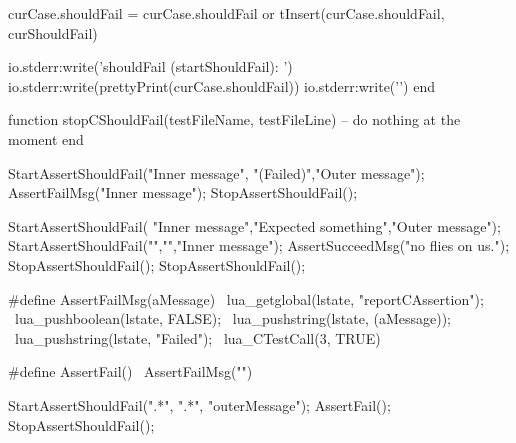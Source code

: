   curCase.shouldFail = curCase.shouldFail or { }
  tInsert(curCase.shouldFail, curShouldFail)
  
  io.stderr:write('shouldFail (startShouldFail): \n')
  io.stderr:write(prettyPrint(curCase.shouldFail))
  io.stderr:write('\n')
end

function stopCShouldFail(testFileName, testFileLine)
  -- do nothing at the moment
end
\stopLuaCode


\startCTest
StartAssertShouldFail("Inner message", "(Failed)","Outer message");
  AssertFailMsg("Inner message");
StopAssertShouldFail();
\stopCTest
\stopTestCase


\startCTest
StartAssertShouldFail(
  "Inner message","Expected something","Outer message");
  StartAssertShouldFail("","","Inner message");
    AssertSucceedMsg("no flies on us.");
  StopAssertShouldFail();
StopAssertShouldFail();
\stopCTest
\stopTestCase


\startConTest
{}
\stopAssertShouldFail
\stopAssertShouldFail

\stopAssertShouldFail
\stopAssertShouldFail
\stopConTest
\skipTestCase

\stopTestSuite

\startTestSuite[assertFail]

\startCHeader
#define AssertFailMsg(aMessage)              \
  lua_getglobal(lstate, "reportCAssertion"); \
  lua_pushboolean(lstate, FALSE);            \
  lua_pushstring(lstate, (aMessage));        \
  lua_pushstring(lstate, "Failed");          \
  lua_CTestCall(3, TRUE)
  
#define AssertFail() \
  AssertFailMsg("")
\stopCHeader


\startCTest
  StartAssertShouldFail(".*", ".*", "outerMessage");
    AssertFail();
  StopAssertShouldFail();
\stopCTest

